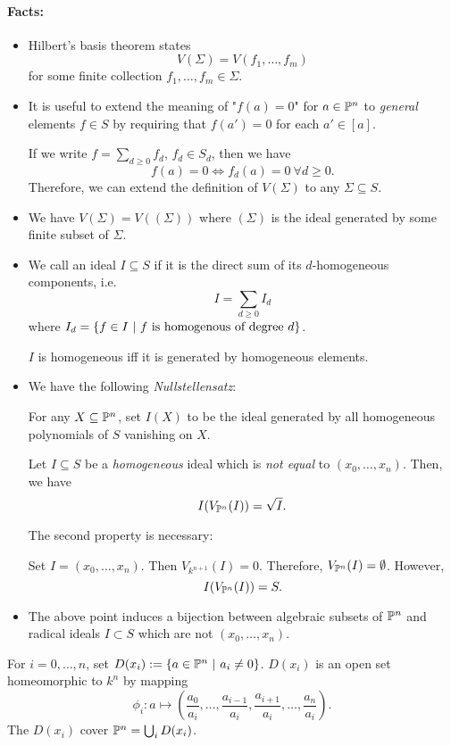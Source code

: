 \paragraph{Facts:}
\begin{itemize}
	\item Hilbert's basis theorem states
	\[ V(\Sigma) = V(f_1, \ldots, f_m) \]
	for some finite collection $f_1,\ldots, f_m \in \Sigma$.
	\item It is useful to extend the meaning of "$f(a) = 0$" for $a \in \P^n$ to \emph{general} elements $f \in S$ by requiring that $f(a') = 0$ for each $a' \in [a]$.
	
	If we write $f = \sum_{d \geq 0} f_d$, $f_d \in S_d$, then we have
	\[ f(a) = 0 \iff f_d(a) = 0 ~ \forall d \geq 0. \]
	Therefore, we can extend the definition of $V(\Sigma)$ to any $\Sigma \subseteq S$.
	\item We have $V(\Sigma) = V((\Sigma))$ where $(\Sigma)$ is the ideal generated by some finite subset of $\Sigma$.
	\item We call an ideal $I \subseteq S$  if it is the direct sum of its $d$-homogeneous components, i.e.
	\[ I = \sum_{d \geq 0}I_d \]
	where $I_d = \set{f \in I}{f \text{ is homogenous of degree }d}$.
	
	$I$ is homogeneous iff it is generated by homogeneous elements.
	\item We have the following \emph{Nullstellensatz}:
	
	For any $X \subseteq \P^n$, set $I(X)$ to be the ideal generated by all homogeneous polynomials of $S$ vanishing on $X$.
	
	Let $I \subseteq S$ be a \emph{homogeneous} ideal which is \emph{not equal} to $(x_0, \ldots, x_n)$. Then, we have
	\[ I(V_{\P^n}(I)) = \sqrt{I}. \]
\begin{example}
	The second property is necessary:
	
Set $I = (x_0, \ldots, x_n)$. Then $V_{k^{n+1}}(I) = 0$. Therefore, $V_{\P^n}(I) = \emptyset$. However,
\[ I(V_{\P^n}(I)) = S. \]
\end{example}
\item The above point induces a bijection between algebraic subsets of $\P^n$ and radical ideals $I \subset S$ which are not $(x_0,\ldots, x_n)$.
\end{itemize}

For $i = 0,\ldots, n$, set $D(x_i) := \set{a \in \P^n}{a_i \neq 0}$. $D(x_i)$ is an open set homeomorphic to $k^n$ by mapping
\[ \phi_i : a \longmapsto (\frac{a_0}{a_i}, \ldots,\frac{a_{i-1}}{a_i},\frac{a_{i+1}}{a_i},\ldots, \frac{a_{n}}{a_i} ). \]
The $D(x_i)$ cover $\P^n = \bigcup_i D(x_i)$.

